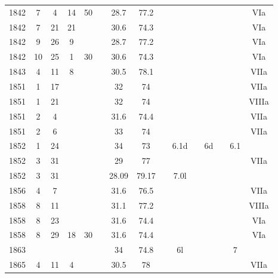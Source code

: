 \begin{flushleft}
\begin{longtable}{|c|c|c|c|c|c|c|c|c|c|c|c|c|c|c|}
1842 & 7  & 4  & 14 & 50 &    & 28.7    & 77.2    &      &       &      &       &      &      & VIa    \\
1842 & 7  & 21 & 21 &    &    & 30.6    & 74.3    &      &       &      &       &      &      & VIa    \\
1842 & 9  & 26 & 9  &    &    & 28.7    & 77.2    &      &       &      &       &      &      & VIa    \\
1842 & 10 & 25 & 1  & 30 &    & 30.6    & 74.3    &      &       &      &       &      &      & VIa    \\
1843 & 4  & 11 & 8  &    &    & 30.5    & 78.1    &      &       &      &       &      &      & VIIa   \\
1851 & 1  & 17 &    &    &    & 32      & 74      &      &       &      &       &      &      & VIIa   \\
1851 & 1  & 21 &    &    &    & 32      & 74      &      &       &      &       &      &      & VIIIa  \\
1851 & 2  & 4  &    &    &    & 31.6    & 74.4    &      &       &      &       &      &      & VIIa   \\
1851 & 2  & 6  &    &    &    & 33      & 74      &      &       &      &       &      &      & VIIa   \\
1852 & 1  & 24 &    &    &    & 34      & 73      &      & 6.1d  &      & 6d    &      & 6.1  &        \\
1852 & 3  & 31 &    &    &    & 29      & 77      &      &       &      &       &      &      & VIIa   \\
1852 & 3  & 31 &    &    &    & 28.09   & 79.17   &      & 7.0l  &      &       &      &      &        \\
1856 & 4  & 7  &    &    &    & 31.6    & 76.5    &      &       &      &       &      &      & VIIa   \\
1858 & 8  & 11 &    &    &    & 31.1    & 77.2    &      &       &      &       &      &      & VIIIa  \\
1858 & 8  & 23 &    &    &    & 31.6    & 74.4    &      &       &      &       &      &      & VIa    \\
1858 & 8  & 29 & 18 & 30 &    & 31.6    & 74.4    &      &       &      &       &      &      & VIa    \\
1863 &    &    &    &    &    & 34      & 74.8    &      & 6l    &      &       &      & 7    &        \\
1865 & 4  & 11 & 4  &    &    & 30.5    & 78      &      &       &      &       &      &      & VIIa   \\

\end{longtable}
\end{flushleft}
